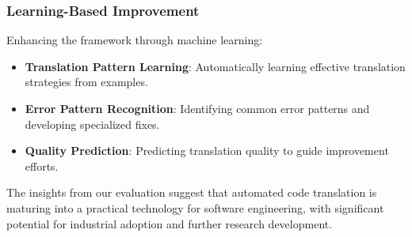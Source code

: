 \subsubsection{Learning-Based Improvement}
Enhancing the framework through machine learning:

\begin{itemize}
\item \textbf{Translation Pattern Learning}: Automatically learning effective translation strategies from examples.
\item \textbf{Error Pattern Recognition}: Identifying common error patterns and developing specialized fixes.
\item \textbf{Quality Prediction}: Predicting translation quality to guide improvement efforts.
\end{itemize}

The insights from our evaluation suggest that automated code translation is maturing into a practical technology for software engineering, with significant potential for industrial adoption and further research development.